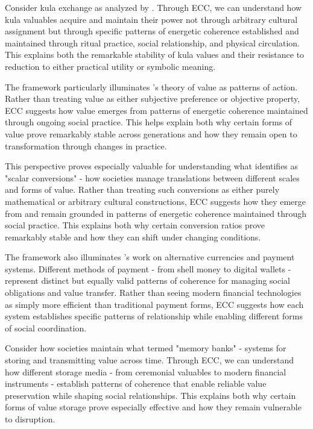 \begin{refsection}
Consider kula exchange as analyzed by \cite{malinowski1922argonauts}. Through ECC, we can understand how kula valuables acquire and maintain their power not through arbitrary cultural assignment but through specific patterns of energetic coherence established and maintained through ritual practice, social relationship, and physical circulation. This explains both the remarkable stability of kula values and their resistance to reduction to either practical utility or symbolic meaning.

The framework particularly illuminates \cite{graeber2001toward}'s theory of value as patterns of action. Rather than treating value as either subjective preference or objective property, ECC suggests how value emerges from patterns of energetic coherence maintained through ongoing social practice. This helps explain both why certain forms of value prove remarkably stable across generations and how they remain open to transformation through changes in practice.

This perspective proves especially valuable for understanding what \cite{guyer2004marginal} identifies as "scalar conversions" - how societies manage translations between different scales and forms of value. Rather than treating such conversions as either purely mathematical or arbitrary cultural constructions, ECC suggests how they emerge from and remain grounded in patterns of energetic coherence maintained through social practice. This explains both why certain conversion ratios prove remarkably stable and how they can shift under changing conditions.

The framework also illuminates \cite{maurer2015how}'s work on alternative currencies and payment systems. Different methods of payment - from shell money to digital wallets - represent distinct but equally valid patterns of coherence for managing social obligations and value transfer. Rather than seeing modern financial technologies as simply more efficient than traditional payment forms, ECC suggests how each system establishes specific patterns of relationship while enabling different forms of social coordination.

Consider how societies maintain what \cite{hart2000memory} termed "memory banks" - systems for storing and transmitting value across time. Through ECC, we can understand how different storage media - from ceremonial valuables to modern financial instruments - establish patterns of coherence that enable reliable value preservation while shaping social relationships. This explains both why certain forms of value storage prove especially effective and how they remain vulnerable to disruption.


\end{refsection}
